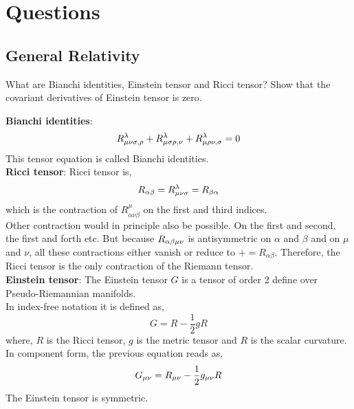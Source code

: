 \documentclass[../main-sheet.tex]{subfiles}
\begin{document}
\chapter{Questions}
\section{General Relativity}
        \begin{prob}[7]
            What are Bianchi identities, Einstein tensor and Ricci tensor? Show that the covariant derivatives of Einstein tensor is zero.
        \end{prob}
        \begin{soln}
            \textbf{Bianchi identities}:
            \[R_{{\mu\nu} \sigma,\rho}^\lambda+R_{\mu \sigma \rho,\nu}^\lambda+R_{\mu \rho \nu,\sigma}^\lambda=0\]
            This tensor equation is called Bianchi identities.\\
            
            
            \textbf{Ricci tensor}: Ricci tensor is,
            \[R_{\alpha\beta}=R_{{\mu\nu} \sigma}^\lambda=R_{\beta\alpha}\]
            which is the contraction of \(R_{\alpha \nu\beta}^\mu\) on the first and third indices.\\
            Other contraction would in principle also be possible. On the first and second, the first and forth etc. But because \(R_{\alpha\beta{\mu\nu}}\) is antisymmetric on \(\alpha\) and \(\beta\) and on \(\mu\) and \(\nu\), all these contractions either vanish or reduce to \(+=R_{\alpha\beta}\). Therefore, the Ricci tensor is the only contraction of the Riemann tensor.\\
            
            \textbf{Einstein tensor}: The Einstein tensor \(G\) is a tensor of order 2 define over Pseudo-Riemannian manifolds.\\
            In index-free notation it is defined as,
            \[G=R-\frac{1}{2}gR\]
            where, \(R\) is the Ricci tensor, \(g\) is the metric tensor and \(R\) is the scalar curvature.\\
            In component form, the previous equation reads as,
            \[G_{\mu\nu}=R_{\mu\nu}-\frac{1}{2}g_{\mu\nu} R\]
            The Einstein tensor is symmetric.\\


\end{soln}
\end{document}
